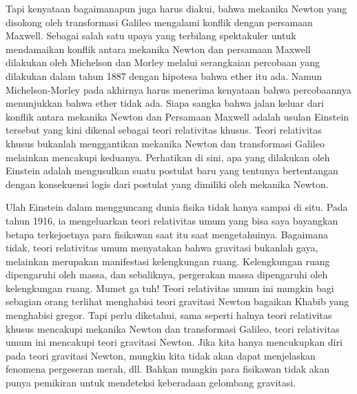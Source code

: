 Tapi kenyataan bagaimanapun juga harus diakui, bahwa mekanika Newton yang disokong oleh transformasi Galileo mengalami konflik dengan persamaan Maxwell. Sebagai salah satu upaya yang terbilang spektakuler untuk mendamaikan konflik antara mekanika Newton dan persamaan Maxwell dilakukan oleh Michelson dan Morley melalui serangkaian percobaan yang dilakukan dalam tahun 1887 dengan hipotesa bahwa ether itu ada. Namun Michelson-Morley pada akhirnya harus menerima kenyataan bahwa percobaannya menunjukkan bahwa ether tidak ada. Siapa sangka bahwa jalan keluar dari konflik antara mekanika Newton dan Persamaan Maxwell adalah usulan Einstein tersebut yang kini dikenal sebagai teori relativitas khusus. Teori relativitas khusus bukanlah menggantikan mekanika Newton dan transformasi Galileo melainkan mencakupi keduanya. Perhatikan di sini, apa yang dilakukan oleh Einstein adalah mengusulkan suatu postulat baru yang tentunya bertentangan dengan konsekuensi logis dari postulat yang dimiliki oleh mekanika Newton. 

Ulah Einstein dalam mengguncang dunia fisika tidak hanya sampai di situ. Pada tahun 1916, ia mengeluarkan teori relativitas umum yang bisa saya bayangkan betapa terkejoetnya para fisikawan saat itu saat mengetahuinya. Bagaimana tidak, teori relativitas umum menyatakan bahwa gravitasi bukanlah gaya, melainkan merupakan manifestasi kelengkungan ruang. Kelengkungan ruang dipengaruhi oleh massa, dan sebaliknya, pergerakan massa dipengaruhi oleh kelengkungan ruang. Mumet ga tuh! Teori relativitas umum ini mungkin bagi sebagian orang terlihat  menghabisi teori gravitasi Newton bagaikan Khabib yang menghabisi gregor. Tapi perlu diketahui, sama seperti halnya teori relativitas khusus mencakupi mekanika Newton dan transformasi Galileo, teori relativitas umum ini mencakupi teori gravitasi Newton. Jika kita hanya mencukupkan diri pada teori gravitasi Newton, mungkin kita tidak akan dapat menjelaskan fenomena pergeseran merah, dll. Bahkan mungkin para fisikawan tidak akan punya pemikiran untuk mendeteksi keberadaan gelombang gravitasi.
